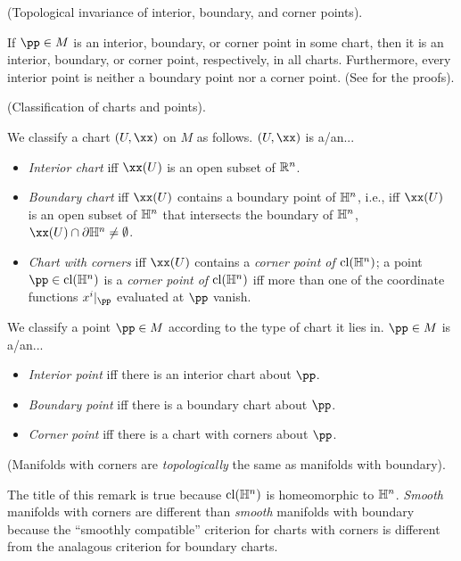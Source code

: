 \begin{theorem}
      (Topological invariance of interior, boundary, and corner points).
        
    If $\pp \in M$ is an interior, boundary, or corner point in some chart, then it is an interior, boundary, or corner point, respectively, in all charts. Furthermore, every interior point is neither a boundary point nor a corner point. (See \cite{book::SM} for the proofs).
\end{theorem}

\begin{defn}
      (Classification of charts and points).
    
    We classify a chart $(U, \xx)$ on $M$ as follows. $(U, \xx)$ is a/an...
    
    \begin{itemize}
        \item \textit{Interior chart} iff $\xx(U)$ is an open subset of $\mathbb{R}^n$.
        \item \textit{Boundary chart} iff $\xx(U)$ contains a boundary point of $\mathbb{H}^n$, i.e., iff $\xx(U)$ is an open subset of $\mathbb{H}^n$ that intersects the boundary of $\mathbb{H}^n$, $\xx(U) \cap \pd \H^n \neq \emptyset$.
        \item \textit{Chart with corners} iff $\xx(U)$ contains a \textit{corner point of $\text{cl}(\mathbb{H}^n)$}; a point $\pp \in \cl(\H^n)$ is a \textit{corner point of $\text{cl}(\mathbb{H}^n)$} iff more than one of the coordinate functions $x^i|_\pp$ evaluated at $\pp$ vanish.
    \end{itemize}
    
    We classify a point $\pp \in M$ according to the type of chart it lies in. $\pp \in M$ is a/an...
    
    \begin{itemize}
        \item \textit{Interior point} iff there is an interior chart about $\pp$.
        \item \textit{Boundary point} iff there is a boundary chart about $\pp$.
        \item \textit{Corner point} iff there is a chart with corners about $\pp$.
    \end{itemize}
\end{defn}

\begin{remark}
     (Manifolds with corners are \textit{topologically} the same as manifolds with boundary).
    
    The title of this remark is true because $\text{cl}(\mathbb{H}^n)$ is homeomorphic to $\mathbb{H}^n$. \textit{Smooth} manifolds with corners are different than \textit{smooth} manifolds with boundary because the ``smoothly compatible'' criterion for charts with corners is different from the analagous criterion for boundary charts.
\end{remark}

